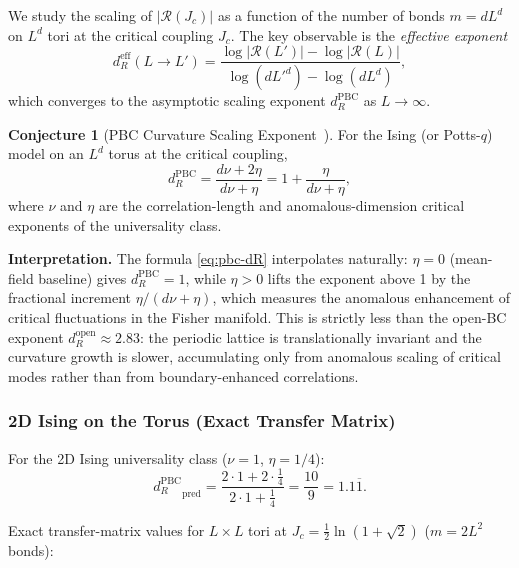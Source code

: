 \documentclass[11pt]{article}
\theoremstyle{definition}
\newtheorem{conjecture}[theorem]{Conjecture}
\theoremstyle{remark}
\newcommand{\Scal}{\mathcal{R}}
\begin{document}
We study the scaling of $|\Scal(J_c)|$ as a function of the number of bonds
$m = dL^d$ on $L^d$ tori at the critical coupling $J_c$. The key observable
is the \emph{effective exponent}
\begin{equation}
  d_R^{\mathrm{eff}}(L{\to}L') = \frac{\log|\Scal(L')| - \log|\Scal(L)|}
    {\log(dL'^d) - \log(dL^d)},
  \label{eq:dR-eff-def}
\end{equation}
which converges to the asymptotic scaling exponent $d_R^{\mathrm{PBC}}$ as $L \to \infty$.

\begin{conjecture}[PBC Curvature Scaling Exponent~\cite{PredLetter}]
\label{conj:pbc-scaling}
For the Ising (or Potts-$q$) model on an $L^d$ torus at the critical coupling,
\begin{equation}
  \boxed{d_R^{\mathrm{PBC}} = \frac{d\nu + 2\eta}{d\nu + \eta}
    = 1 + \frac{\eta}{d\nu + \eta},}
  \label{eq:pbc-dR}
\end{equation}
where $\nu$ and $\eta$ are the correlation-length and anomalous-dimension
critical exponents of the universality class.
\end{conjecture}

\noindent\textbf{Interpretation.} The formula \eqref{eq:pbc-dR} interpolates naturally:
$\eta = 0$ (mean-field baseline) gives $d_R^{\mathrm{PBC}} = 1$, while
$\eta > 0$ lifts the exponent above 1 by the fractional increment
$\eta/(d\nu + \eta)$, which measures the anomalous enhancement of critical
fluctuations in the Fisher manifold.
This is strictly less than the open-BC exponent $d_R^{\mathrm{open}} \approx 2.83$:
the periodic lattice is translationally invariant and the curvature growth is slower,
accumulating only from anomalous scaling of critical modes rather than from
boundary-enhanced correlations.

\subsubsection{2D Ising on the Torus (Exact Transfer Matrix)}

For the 2D Ising universality class ($\nu = 1$, $\eta = 1/4$):
\begin{equation}
  {d_R^{\mathrm{PBC}}}_{\text{pred}} = \frac{2 \cdot 1 + 2 \cdot \tfrac{1}{4}}{2 \cdot 1 + \tfrac{1}{4}}
    = \frac{10}{9} = 1.1\overline{1}.
  \label{eq:pbc-2d-pred}
\end{equation}

Exact transfer-matrix values for $L \times L$ tori at $J_c = \tfrac{1}{2}\ln(1+\sqrt{2})$
($m = 2L^2$ bonds):
\end{document}
